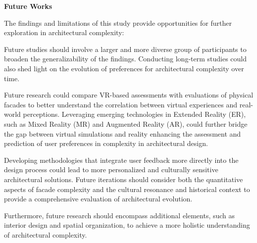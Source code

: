 
\textbf{Future Works}

The findings and limitations of this study provide opportunities for further exploration in architectural complexity:

Future studies should involve a larger and more diverse group of participants to broaden the generalizability of the findings.
Conducting long-term studies could also shed light on the evolution of preferences for architectural complexity over time.

Future research could compare VR-based assessments with evaluations of physical facades to better understand the correlation between virtual experiences and real-world perceptions.
Leveraging emerging technologies in Extended Reality (ER), such as Mixed Reality (MR) and Augmented Reality (AR), could further bridge the gap between virtual simulations and reality enhancing the assessment and prediction of user preferences in complexity in architectural design.


Developing methodologies that integrate user feedback more directly into the design process could lead to more personalized and culturally sensitive architectural solutions.
Future iterations should consider both the quantitative aspects of facade complexity and the cultural resonance and historical context to provide a comprehensive evaluation of architectural evolution.

Furthermore, future research should encompass additional elements, such as interior design and spatial organization, to achieve a more holistic understanding of architectural complexity.

